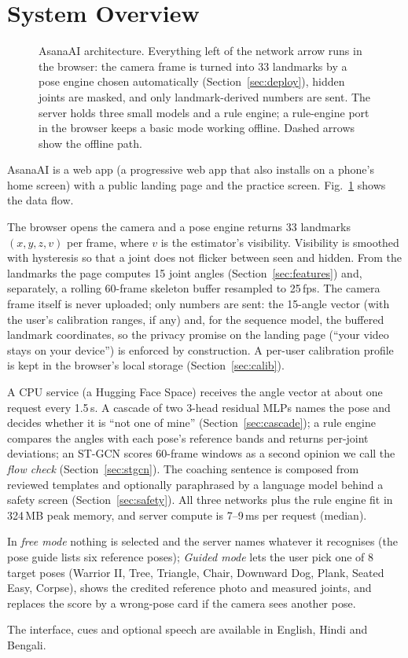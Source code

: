\section{System Overview}\label{sec:system}
\begin{figure}[t]
\centering
\resizebox{0.98\textwidth}{!}{}
\caption{AsanaAI architecture. Everything left of the network arrow runs in the browser: the camera frame is turned into 33 landmarks by a pose engine chosen automatically (Section~\ref{sec:deploy}), hidden joints are masked, and only landmark-derived numbers are sent. The server holds three small models and a rule engine; a rule-engine port in the browser keeps a basic mode working offline. Dashed arrows show the offline path.}
\label{fig:arch}
\end{figure}
AsanaAI is a web app (a progressive web app that also installs on a phone's home screen) with a public landing page and the practice screen. Fig.~\ref{fig:arch} shows the data flow.

 The browser opens the camera and a pose engine returns 33 landmarks $(x,y,z,v)$ per frame, where $v$ is the estimator's visibility. Visibility is smoothed with hysteresis so that a joint does not flicker between seen and hidden. From the landmarks the page computes 15 joint angles (Section~\ref{sec:features}) and, separately, a rolling 60-frame skeleton buffer resampled to 25\,fps. The camera frame itself is never uploaded; only numbers are sent: the 15-angle vector (with the user's calibration ranges, if any) and, for the sequence model, the buffered landmark coordinates, so the privacy promise on the landing page (``your video stays on your device'') is enforced by construction. A per-user calibration profile is kept in the browser's local storage (Section~\ref{sec:calib}).

 A CPU service (a Hugging Face Space) receives the angle vector at about one request every 1.5\,s. A cascade of two 3-head residual MLPs names the pose and decides whether it is ``not one of mine'' (Section~\ref{sec:cascade}); a rule engine compares the angles with each pose's reference bands and returns per-joint deviations; an ST-GCN scores 60-frame windows as a second opinion we call the \emph{flow check} (Section~\ref{sec:stgcn}). The coaching sentence is composed from reviewed templates and optionally paraphrased by a language model behind a safety screen (Section~\ref{sec:safety}). All three networks plus the rule engine fit in 324\,MB peak memory, and server compute is 7--9\,ms per request (median).

 In \emph{free mode} nothing is selected and the server names whatever it recognises (the pose guide lists six reference poses); \emph{Guided mode} lets the user pick one of 8 target poses (Warrior II, Tree, Triangle, Chair, Downward Dog, Plank, Seated Easy, Corpse), shows the credited reference photo and measured joints, and replaces the score by a wrong-pose card if the camera sees another pose.

 The interface, cues and optional speech are available in English, Hindi and Bengali.
